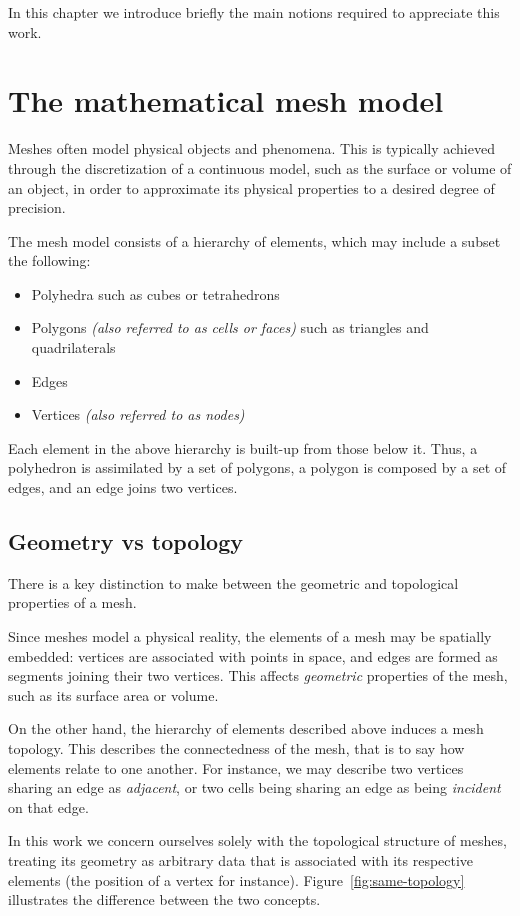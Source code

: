 In this chapter we introduce briefly the main notions required to appreciate this work.

\section{The mathematical mesh model}

Meshes often model physical objects and phenomena. This is typically achieved through the discretization of a continuous model, such as the surface or volume of an object, in order to approximate its physical properties to a desired degree of precision.
\par

The mesh model consists of a hierarchy of elements, which may include a subset the following:
\begin{itemize}
\item Polyhedra such as cubes or tetrahedrons
\item Polygons \emph{(also referred to as cells or faces)} such as triangles and quadrilaterals
\item Edges
\item Vertices \emph{(also referred to as nodes)}
\end{itemize}



Each element in the above hierarchy is built-up from those below it. Thus, a polyhedron is assimilated by a set of polygons, a polygon is composed by a set of edges, and an edge joins two vertices.


\subsection{Geometry vs topology}
There is a key distinction to make between the geometric and topological properties of a mesh.

Since meshes model a physical reality, the elements of a mesh may be spatially embedded: vertices are associated with points in space, and edges are formed as segments joining their two vertices. This affects \emph{geometric} properties of the mesh, such as its surface area or volume.

On the other hand, the hierarchy of elements described above induces a mesh topology. This describes the connectedness of the mesh, that is to say how elements relate to one another. For instance, we may describe two vertices sharing an edge as \emph{adjacent}, or two cells being sharing an edge as being \emph{incident} on that edge.
\par
In this work we concern ourselves solely with the topological structure of meshes, treating its geometry as arbitrary data that is associated with its respective elements (the position of a vertex for instance). Figure~\ref{fig:same-topology} illustrates the difference between the two concepts.

